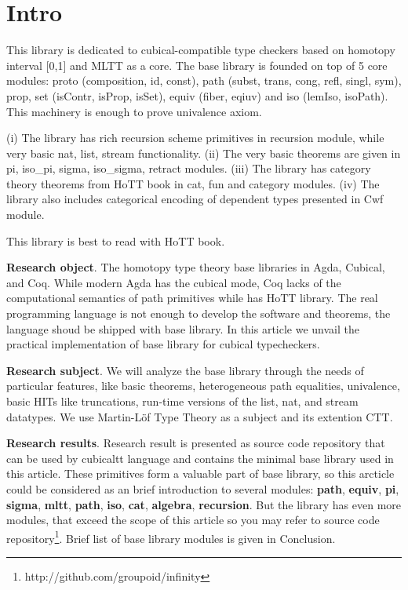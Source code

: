 \documentclass{article}
\begin{document}
\newpage
\tableofcontents

\newpage
\section{Intro}

This library is dedicated to cubical-compatible type checkers \cite{Mortberg17} based
on homotopy interval [0,1] and MLTT as a core. The base library is
founded on top of 5 core modules: proto (composition, id, const),
path (subst, trans, cong, refl, singl, sym), prop, set (isContr, isProp, isSet),
equiv (fiber, eqiuv) and iso (lemIso, isoPath).
This machinery is enough to prove univalence axiom.

(i) The library has rich recursion scheme primitives
in recursion module, while very basic nat, list, stream
functionality. (ii) The very basic theorems are given
in pi, iso\_pi, sigma, iso\_sigma, retract modules.
(iii) The library has category theory theorems from
HoTT book in cat, fun and category modules.
(iv) The library also includes categorical encoding
of dependent types presented in Cwf module.

This library is best to read with HoTT book.

{\bf Research object}. The homotopy type theory base libraries in Agda, Cubical, and Coq.
While modern Agda has the cubical mode, Coq lacks of the computational semantics of path primitives
while has HoTT library. The real programming language is not enough to
develop the software and theorems, the language shoud be shipped with base library. In this article
we unvail the practical implementation of base library for cubical typecheckers.

{\bf Research subject}. We will analyze the base library through the needs of particular features,
like basic theorems, heterogeneous path equalities, univalence, basic HITs like truncations, run-time
versions of the list, nat, and stream datatypes. We use Martin-Löf Type Theory as a subject and
its extention CTT.

{\bf Research results}. Research result is presented as source code repository that can be used by
cubicaltt language and contains the minimal base library used in this article.
These primitives form a valuable part of base library, so this arcticle could be
considered as an brief introduction to several modules: {\bf path}, {\bf equiv}, {\bf pi},
{\bf sigma}, {\bf mltt}, {\bf path}, {\bf iso}, {\bf cat}, {\bf algebra}, {\bf recursion}.
But the library has even more modules, that
exceed the scope of this article so you may refer to source code
repository\footnote{http://github.com/groupoid/infinity}. Brief list of base library modules is given
in Conclusion.
\end{document}
